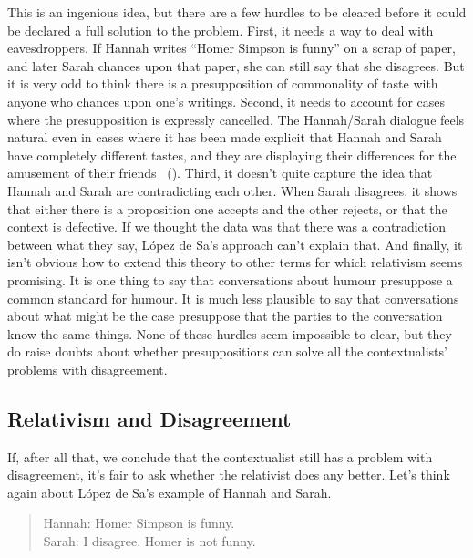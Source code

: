 \documentclass[
  11pt,
  letterpaper,
  DIV=11,
  numbers=noendperiod,
  twoside]{scrartcl}
\begin{document}
This is an ingenious idea, but there are a few hurdles to be cleared
before it could be declared a full solution to the problem. First, it
needs a way to deal with eavesdroppers. If Hannah writes ``Homer Simpson
is funny'' on a scrap of paper, and later Sarah chances upon that paper,
she can still say that she disagrees. But it is very odd to think there
is a presupposition of commonality of taste with anyone who chances upon
one's writings. Second, it needs to account for cases where the
presupposition is expressly cancelled. The Hannah/Sarah dialogue feels
natural even in cases where it has been made explicit that Hannah and
Sarah have completely different tastes, and they are displaying their
differences for the amusement of their friends
~(). Third, it
doesn't quite capture the idea that Hannah and Sarah are contradicting
each other. When Sarah disagrees, it shows that either there is a
proposition one accepts and the other rejects, or that the context is
defective. If we thought the data was that there was a contradiction
between what they say, López de Sa's approach can't explain that. And
finally, it isn't obvious how to extend this theory to other terms for
which relativism seems promising. It is one thing to say that
conversations about humour presuppose a common standard for humour. It
is much less plausible to say that conversations about what might be the
case presuppose that the parties to the conversation know the same
things. None of these hurdles seem impossible to clear, but they do
raise doubts about whether presuppositions can solve all the
contextualists' problems with disagreement.

\subsection{Relativism and
Disagreement}\label{relativismanddisagreement}

If, after all that, we conclude that the contextualist still has a
problem with disagreement, it's fair to ask whether the relativist does
any better. Let's think again about López de Sa's example of Hannah and
Sarah.

\begin{quote}
Hannah: Homer Simpson is funny.\\
Sarah: I disagree. Homer is not funny.
\end{quote}
\end{document}
